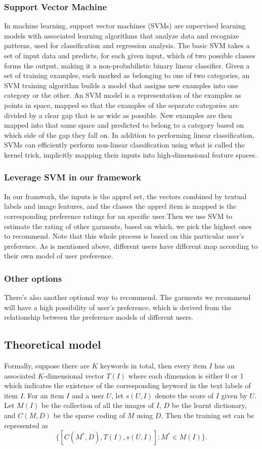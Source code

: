 \subsubsection{Support Vector Machine}
In machine learning, support vector machines (SVMs) are supervised learning models with associated learning algorithms that analyze data and recognize patterns, used for classification and regression analysis. The basic SVM takes a set of input data and predicts, for each given input, which of two possible classes forms the output, making it a non-probabilistic binary linear classifier. Given a set of training examples, each marked as belonging to one of two categories, an SVM training algorithm builds a model that assigns new examples into one category or the other. An SVM model is a representation of the examples as points in space, mapped so that the examples of the separate categories are divided by a clear gap that is as wide as possible. New examples are then mapped into that same space and predicted to belong to a category based on which side of the gap they fall on.
In addition to performing linear classification, SVMs can efficiently perform non-linear classification using what is called the kernel trick, implicitly mapping their inputs into high-dimensional feature spaces.

\subsubsection{Leverage SVM in our framework}
In our framwork, the inputs is the apprel set, the vectors combined by textual labels and image features, and the classes the apprel item is mapped is the corresponding preference ratings for an specific user.Then we use SVM to estimate the rating of other garments, based on which, we pick the highest ones to recommend. 
Note that this whole process is based on this particular user's preference. As is mentioned above, different users have different map according to their own model of user preference. 

\subsubsection{Other options}
There's also another optional way to recommend. 
The garments we recommend will have a high possibility of user's preference, 
  which is derived from the relationship between the preference models of different users.

\subsection{Theoretical model}
Formally, suppose there are $K$ keywords in total, then every item $I$ has an associated 
  $K$-dimensional vector $T(I)$ where each dimension is either 0 or 1 which indicates the 
  existence of the corresponding keyword in the text labels of item $I$.
For an item $I$ and a user $U$, let $s(U,I)$ denote the score of $I$ given by $U$. 
Let $M(I)$ be the collection of all the images of $I$, $D$ be the learnt dictionary, and
  $C(M,D)$ be the sparse coding of $M$ using $D$.
Then the training set can be represented as $$ \{ [C(M^*,D), T(I), s(U,I)] : M^* \in M(I) \} .$$
